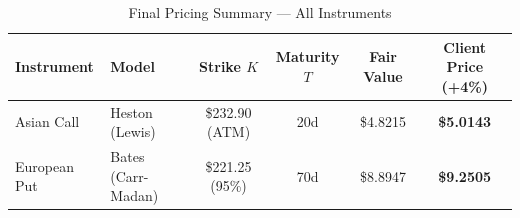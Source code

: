 \documentclass[12pt,a4paper]{article}
\newcommand{\thead}[1]{\cellcolor{headernavy}\color{white}\textbf{#1}}
\newcommand{\rowA}{\rowcolor{white}}
\newcommand{\rowB}{\rowcolor{rowgray}}
\begin{document}
\begin{appendices}
\begin{table}[H]
  \centering
  \caption{Final Pricing Summary --- All Instruments}
  \begin{tabular}{llcccc}
    \hline
    \thead{Instrument} & \thead{Model} & \thead{Strike $K$} & \thead{Maturity $T$} & \thead{Fair Value} & \thead{Client Price (+4\%)} \\
    \hline
    \rowA Asian Call   & Heston (Lewis)     & \$232.90 (ATM)  & 20d & \$4.8215 & \textbf{\$5.0143} \\
    \rowB European Put & Bates (Carr-Madan) & \$221.25 (95\%) & 70d & \$8.8947 & \textbf{\$9.2505} \\
    \hline
  \end{tabular}
\end{table}

\end{appendices}
\end{document}
